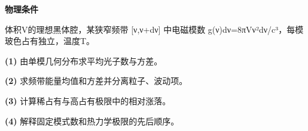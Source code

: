 \textbf{物理条件}\par 体积V的理想黑体腔，某狭窄频带 [ν,ν+dν] 中电磁模数 g(ν)dν=8πVν²dν/c³，每模玻色占有独立，温度T。
\par\noindent\textbf{(1)} 由单模几何分布求平均光子数与方差。
\par\noindent\textbf{(2)} 求频带能量均值和方差并分离粒子、波动项。
\par\noindent\textbf{(3)} 计算稀占有与高占有极限中的相对涨落。
\par\noindent\textbf{(4)} 解释固定模式数和热力学极限的先后顺序。
